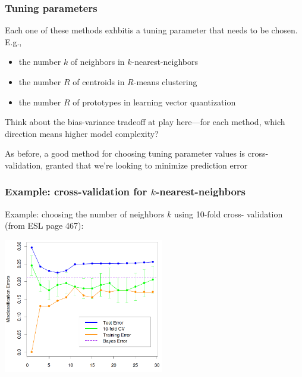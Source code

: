 \documentclass[mathserif]{beamer}
\def\red{\color[rgb]{0.8,0,0}}
\begin{document}
\begin{frame}
\frametitle{Tuning parameters}
Each one of these methods exhbitis a {\red tuning parameter} that needs
to be chosen. E.g.,
\begin{itemize}
\item the number $k$ of neighbors in $k$-nearest-neighbors
\item the number $R$ of centroids in $R$-means clustering
\item the number $R$ of prototypes in learning vector quantization
\end{itemize}

\bigskip
Think about the bias-variance tradeoff at play here---for each 
method, which direction means higher model complexity?

\bigskip
As before, a good method for choosing tuning parameter
values is {\red cross-validation}, granted that we're looking to 
minimize prediction error
\end{frame}

\begin{frame}
\frametitle{Example: cross-validation for $k$-nearest-neighbors}
\smallskip\smallskip
Example: choosing the number of neighbors $k$ using 10-fold cross-
validation (from ESL page 467):

\begin{center}
\includegraphics[width=2.75in]{tune.png}
\end{center}
\end{frame}
\end{document}
